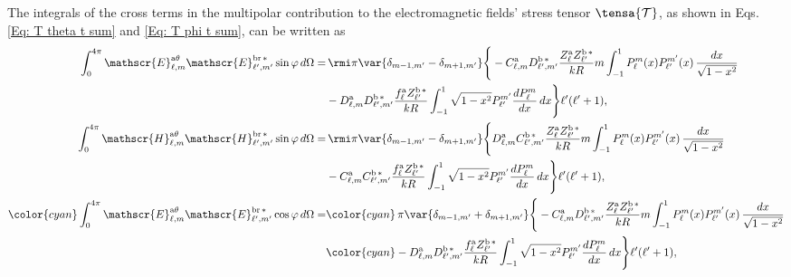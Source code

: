 The integrals of the cross terms in the multipolar contribution to the electromagnetic fields' stress tensor $\tensa{\mathcal{T}}$, as shown in Eqs. \eqref{Eq: T theta t sum} and \eqref{Eq: T phi t sum}, can be written as
%
\begin{align}
\int_{0}^{4\pi} \mathscr{E}_{\ell, m}^{\text{a}\theta}\mathscr{E}_{\ell^{\prime}, m^{\prime}}^{\text{br}\,*} \sin\varphi \, d\Omega =& 
%
\, \rmi \pi \var{ \delta_{m-1, m^{\prime}} - \delta_{m+1, m^{\prime}} } \Bigg\{-C_{\ell,m}^{\rm a}D_{\ell^{\prime}, m^{\prime}}^{\rm b \, *}\frac{Z_{\ell}^{\rm a}Z_{\ell^{\prime}}^{\rm b\, *}}{k R} m \int_{-1}^1 P_{\ell}^{m}(x) P_{\ell^{\prime}}^{m^{\prime}}(x) \, \frac{dx}{\sqrt{1-x^2}} \nonumber \\
%
&-D_{\ell, m}^{\rm a}D_{\ell^{\prime}, m^{\prime}}^{\rm b \, *} \frac{f_{\ell}^{\rm a}Z_{\ell^{\prime}}^{\rm b \, *}}{k R}   \int_{-1}^1 \sqrt{1-x^2} P_{\ell^{\prime}}^{m^{\prime}} \frac{dP_{\ell}^m}{dx} \,dx \Bigg\}\ell^{\prime}(\ell^{\prime}+1),\\
%
%
\int_{0}^{4\pi} \mathscr{H}_{\ell, m}^{\text{a}\theta}\mathscr{H}_{\ell^{\prime}, m^{\prime}}^{\text{br}\,*} \sin\varphi \, d\Omega =& 
%
\, \rmi \pi \var{ \delta_{m-1, m^{\prime}} - \delta_{m+1, m^{\prime}} } \Bigg\{D_{\ell,m}^{\rm a}C_{\ell^{\prime}, m^{\prime}}^{\rm b \, *}\frac{Z_{\ell}^{\rm a}Z_{\ell^{\prime}}^{\rm b\, *}}{k R} m \int_{-1}^1 P_{\ell}^{m}(x) P_{\ell^{\prime}}^{m^{\prime}}(x) \, \frac{dx}{\sqrt{1-x^2}} \nonumber \\
%
&-C_{\ell, m}^{\rm a}C_{\ell^{\prime}, m^{\prime}}^{\rm b \, *} \frac{f_{\ell}^{\rm a}Z_{\ell^{\prime}}^{\rm b \, *}}{k R} 
%
\int_{-1}^1 \sqrt{1-x^2} P_{\ell^{\prime}}^{m^{\prime}} \frac{dP_{\ell}^m}{dx} \,dx \Bigg\}\ell^{\prime}(\ell^{\prime}+1),\\
%
%
%
%
\color{cyan}\int_{0}^{4\pi} \mathscr{E}_{\ell, m}^{\text{a}\theta}\mathscr{E}_{\ell^{\prime}, m^{\prime}}^{\text{br}\,*} \cos\varphi \, d\Omega =& 
%
\color{cyan}\, \pi \var{ \delta_{m-1, m^{\prime}} + \delta_{m+1, m^{\prime}} } \Bigg\{-C_{\ell,m}^{\rm a}D_{\ell^{\prime}, m^{\prime}}^{\rm b \, *}\frac{Z_{\ell}^{\rm a}Z_{\ell^{\prime}}^{\rm b\, *}}{k R} m \int_{-1}^1 P_{\ell}^{m}(x) P_{\ell^{\prime}}^{m^{\prime}}(x) \, \frac{dx}{\sqrt{1-x^2}}\nonumber \\
%
&\color{cyan}-D_{\ell, m}^{\rm a}D_{\ell^{\prime}, m^{\prime}}^{\rm b \, *} \frac{f_{\ell}^{\rm a}Z_{\ell^{\prime}}^{\rm b \, *}}{k R} 
%
\int_{-1}^1 \sqrt{1-x^2} P_{\ell^{\prime}}^{m^{\prime}} \frac{dP_{\ell}^m}{dx} \,dx \Bigg\}\ell^{\prime}(\ell^{\prime}+1),\\

\end{align}

